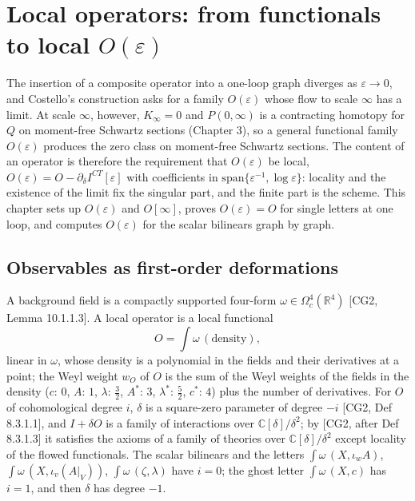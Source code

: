 \chapter{Local operators: from functionals to local $O(\varepsilon)$}

The insertion of a composite operator into a one-loop graph diverges as $\varepsilon\to0$, and Costello's construction asks for a family $O(\varepsilon)$ whose flow to scale $\infty$ has a limit. At scale $\infty$, however, $K_\infty=0$ and $P(0,\infty)$ is a contracting homotopy for $Q$ on moment-free Schwartz sections (Chapter 3), so a general functional family $O(\varepsilon)$ produces the zero class on moment-free Schwartz sections. The content of an operator is therefore the requirement that $O(\varepsilon)$ be local, $O(\varepsilon)=O-\partial_\delta I^{CT}[\varepsilon]$ with coefficients in $\mathrm{span}\{\varepsilon^{-1},\log\varepsilon\}$: locality and the existence of the limit fix the singular part, and the finite part is the scheme. This chapter sets up $O(\varepsilon)$ and $O[\infty]$, proves $O(\varepsilon)=O$ for single letters at one loop, and computes $O(\varepsilon)$ for the scalar bilinears graph by graph.

\section{Observables as first-order deformations}

\begin{definition}
\label{def:c5-family}
A background field is a compactly supported four-form $\omega\in\Omega^4_c(\mathbb R^4)$ [CG2, Lemma 10.1.1.3]. A local operator is a local functional
\[
O=\int\omega\,(\text{density}),
\]
linear in $\omega$, whose density is a polynomial in the fields and their derivatives at a point; the Weyl weight $w_O$ of $O$ is the sum of the Weyl weights of the fields in the density ($c$: $0$, $A$: $1$, $\lambda$: $\tfrac32$, $A^*$: $3$, $\lambda^*$: $\tfrac52$, $c^*$: $4$) plus the number of derivatives. For $O$ of cohomological degree $i$, $\delta$ is a square-zero parameter of degree $-i$ [CG2, Def 8.3.1.1], and $I+\delta O$ is a family of interactions over $\mathbb C[\delta]/\delta^2$; by [CG2, after Def 8.3.1.3] it satisfies the axioms of a family of theories over $\mathbb C[\delta]/\delta^2$ except locality of the flowed functionals. The scalar bilinears and the letters $\int\omega\,(X,\iota_wA)$, $\int\omega\,(X,\iota_v(A|_V))$, $\int\omega\,(\zeta,\lambda)$ have $i=0$; the ghost letter $\int\omega\,(X,c)$ has $i=1$, and then $\delta$ has degree $-1$.
\end{definition}

